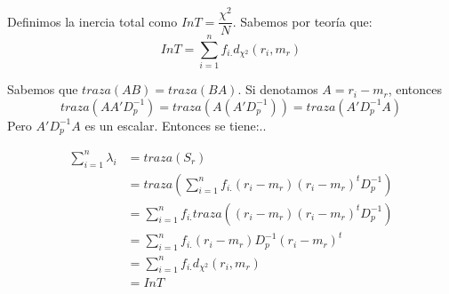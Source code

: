 \documentclass[twoside]{article}
\begin{document}
\begin{enumerate}
Definimos la inercia total como $InT = \dfrac{\chi^2}{N}$. Sabemos por teoría que:
$$
InT = \sum_{i=1}^n f_{i.}d_{\chi^2}(r_i,m_r)
$$


Sabemos que $traza(AB)=traza(BA)$. Si denotamos $A=r_i - m_r$, entonces
$$
traza(AA'D_p^{-1}) = traza(A(A'D_p^{-1})) = traza(A'D_p^{-1}A)
$$
Pero $A'D_p^{-1}A$ es un escalar. Entonces se tiene:..

\begin{align*}
\sum_{i=1}^n \lambda_i & = traza(S_r)\\
&=traza\left(\sum_{i=1}^n f_{i.} (r_i - m_r) (r_i - m_r)^t D_p^{-1} \right)\\
&= \sum_{i=1}^n f_{i.} traza((r_i - m_r) (r_i - m_r)^t D_p^{-1})\\
& = \sum_{i=1}^n f_{i.}(r_i - m_r) D_p^{-1} (r_i - m_r)^t \\
&= \sum_{i=1}^n f_{i.}d_{\chi^2}(r_i,m_r)\\
& = InT
\end{align*}

\end{enumerate}
\newpage
\end{document}

